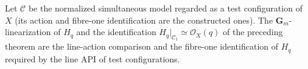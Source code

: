 \begin{definition}
\label{def:pl-original-normalized-tc-tautological-line-data}
\leanok
{}
Let $\mathcal C$ be the normalized simultaneous model regarded as a test
configuration of $X$ (its action and fibre-one identification are the
constructed ones). The $\mathbf G_m$-linearization of $H_q$ and the
identification $H_q|_{\mathcal C_1}\simeq\mathcal O_X(q)$ of the preceding
theorem are the line-action comparison and the fibre-one identification of
$H_q$ required by the line API of test configurations.
\end{definition}
